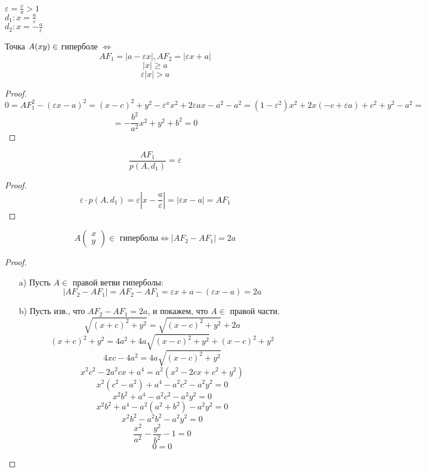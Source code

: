 $\varepsilon = \frac{c}{a} > 1$  \\
$d_1 \colon x = \frac{a}{\varepsilon}$ \\
$d_2 \colon x = -\frac{a}{\varepsilon}$
\begin{statement}
Точка $A(x \\ y) \in $ гиперболе $\iff$
\[
AF_1 = \left|a - \varepsilon x\right|, AF_2 = \left|\varepsilon x + a\right|
\]
\[
\left|x\right| \geq a
\]
\[
\varepsilon \left|x\right| > a
\]
\end{statement}
\begin{proof}
\[
 0 = AF_1^{2} - (\varepsilon x - a)^{2} = (x - c)^{2} + y^{2} - \varepsilon^{x}x^{2} + 2\varepsilon ax - a^{2} - a^{2} = (1 - \varepsilon^{2})x^{2} + 2x(-c + \varepsilon a) + c^{2} + y^{2} - a^{2} = 
\]
\[
 = -\frac{b^{2}}{a^{2}}x^{2} + y^{2} + b^{2} = 0
\]
\end{proof}
\begin{consequence}
\[
\frac{AF_1}{p(A, d_1)} = \varepsilon
\]
\end{consequence}
\begin{proof}
\[
\varepsilon \cdot p(A, d_1) = \varepsilon\left|x - \frac{a}{\varepsilon}\right| = \left|\varepsilon x - a\right| = AF_1
\]
\end{proof}
\begin{theorem}
  \[
  A\begin{pmatrix}x \\ y \end{pmatrix} \in \text{ гиперболы} \iff \left|AF_2 - AF_1\right| = 2a
  \]

\end{theorem}
\begin{proof}
  \begin{itemize}
    \item [a) ]
Пусть $A \in $ правой ветви гиперболы:
\[
\left|AF_2 - AF_1\right| = AF_2 - AF_1 = \varepsilon x + a - (\varepsilon x - a) = 2a
\]
    \item [b) ] Пусть изв., что $AF_2 - AF_1 = 2a$, и покажем, что $A \in $ правой части.
      \[
      \sqrt{(x + c)^{2} + y^{2}} = \sqrt{(x - c)^{2} + y^{2}} + 2a
      \]
      \[
        (x + c)^{2} + y^{2} = 4a^{2} + 4a\sqrt{(x - c)^{2} + y^{2}} + (x - c)^{2} + y^{2}
      \]
      \[
      4xc - 4a^{2} = 4a\sqrt{(x - c)^{2} + y^{2}}
      \]
      \[
      x^{2}c^{2} - 2a^{2}cx + a^{4} = a^{2}(x^{2} - 2cx + c^{2} + y^{2})
      \]
  \[
    x^{2}(c^{2} - a^{2}) + a^{4} - a^{2}c^{2} - a^{2}y^{2} = 0
  \]
  \[
    x^{2}b^{2} + a^{4} - a^{2}c^{2} - a^{2}y^{2} = 0
  \]
  \[
    x^{2}b^{2} + a^{4} - a^{2}(a^{2} + b^{2}) - a^{2}y^{2} = 0
  \]
  \[
    x^{2}b^{2} - a^{2}b^{2} - a^{2}y^{2} = 0
  \]
  \[
   \frac{x^{2}}{a^{2}} - \frac{y^{2}}{b^{2}} - 1 = 0 
  \]
  \[
  0 = 0
  \]
  \end{itemize}
\end{proof}
